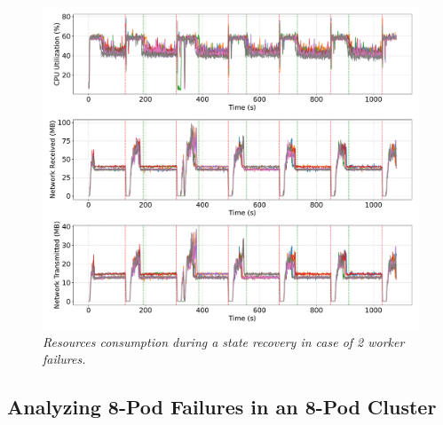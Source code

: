\begin{figure}[ht]
    \centering
    \includegraphics[width=1\textwidth]{figures/flink-2pods/flink_2_pods_resources}
    \caption{\textit{Resources consumption during a state recovery in case of 2 worker failures.}}
    \label{fig:flink-2pods-resource}
\end{figure}


\newpage
\subsection{Analyzing 8-Pod Failures in an 8-Pod Cluster}\label{subsec:analyzing-8-pod-failures-in-an-8-pod-cluster2}

